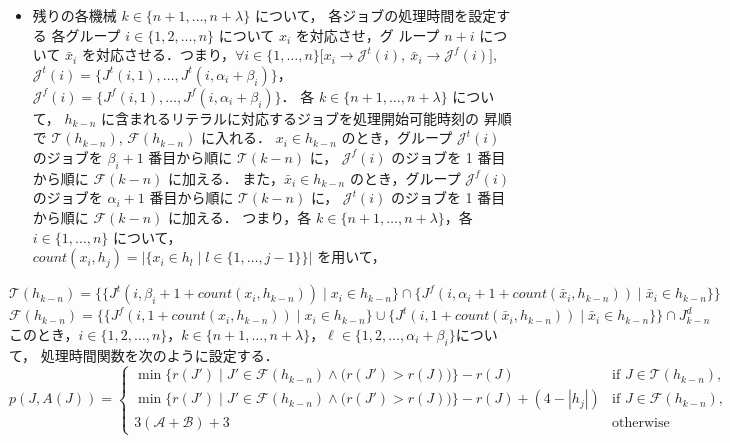 \documentclass[12pt]{optlab-bachelor}
\begin{document}
  \begin{itemize}
  \item 残りの各機械 $k \in \{n + 1, \ldots , n + \lambda\}$ について，
    各ジョブの処理時間を設定する
    各グループ $i \in \{1,2,\ldots,n\}$ について $x_i$ を対応させ，グ
    ループ $n + i$ について $\bar x_i$ を対応させる．つまり，$\forall
    i \in \{1,\ldots,n\}\big[x_i \to \mathcal{J}^t(i),\ \bar x_i \to
    \mathcal{J}^f(i) \big]$,
    $\mathcal{J}^t(i) = \big\{J^t(i,1),\ldots,J^t(i,\alpha_i +
    \beta_i)\big\}$，$\mathcal{J}^f(i) =
    \big\{J^f(i,1),\ldots,J^f(i,\alpha_i + \beta_i)\big\}$．
    各 $k \in \{n + 1, \ldots , n + \lambda\}$ について，
    $h_{k - n}$ に含まれるリテラルに対応するジョブを処理開始可能時刻の
    昇順で $\mathcal{T}(h_{k - n})$, $\mathcal{F}(h_{k - n})$ に入れる．
    $x_i \in h_{k - n}$ のとき，グループ $\mathcal{J}^t(i)$ のジョブを
    $\beta_i + 1$ 番目から順に $\mathcal{T}(k - n)$ に，
    $\mathcal{J}^f(i)$ のジョブを 1 番目から順に $\mathcal{F}(k - n)$ に加える．
    また，$\bar x_i \in h_{k - n}$ のとき，グループ $\mathcal{J}^f(i)$
    のジョブを $\alpha_i + 1$ 番目から順に $\mathcal{T}(k - n)$ に，
    $\mathcal{J}^t(i)$ のジョブを 1 番目から順に $\mathcal{F}(k - n)$ に加える．
    つまり，各 $k \in \{n + 1, \ldots,n + \lambda\}$，各 $i \in \{1,\ldots,n\}$ について，\\
    $count(x_i,h_j) = \big|\big\{x_i \in h_l \mid l \in \{1,\ldots,j -
    1\}\big\}\big|$ を用いて，
  \end{itemize}
    {\footnotesize
      $\mathcal{T}(h_{k - n}) = \bigg\{\big\{J^t(i,\beta_i + 1 +
      count(x_i,h_{k - n})) \mid x_i \in h_{k - n}\big\} \cap
      \big\{J^f(i,\alpha_i + 1 + count(\bar x_i, h_{k - n})) \mid \bar
      x_i \in h_{k - n}\big\}\bigg\}$\\
    }
    {\footnotesize
      $\mathcal{F}(h_{k - n}) = \bigg\{\big\{J^f(i,1 + count(
      x_i,h_{k - n})) \mid x_i \in h_{k - n} \big\} \cup \big\{J^t(i,1
      + count(\bar x_i,h_{k - n})) \mid \bar x_i \in h_{k - n}\big\} \bigg\}
      \cap J^d_{k - n}$\\
    }
    このとき，$i \in \{1,2,\ldots,n\}$，$k \in \{n + 1, \ldots , n +
    \lambda\}$，$\ell \in \{1,2,\ldots, \alpha_i + \beta_i\}$について，
    処理時間関数を次のように設定する．
  {\small
    $$p(J,A(J)) = \left\{ \begin{array}{lll} \min \big\{r(J') \mid J' \in \mathcal{F}(h_{k - n}) \wedge \big(r(J') > r(J) \big) \big\} - r(J) & \text{if } J \in \mathcal{T}(h_{k - n}), \\ \min \big\{r(J') \mid J' \in \mathcal{F}(h_{k - n}) \wedge \big(r(J') > r(J) \big) \big\} - r(J) + (4 - |h_j|) & \text{if } J \in \mathcal{F}(h_{k - n}), \\ 3(\mathcal{A} + \mathcal{B}) + 3 & \text{otherwise}\end{array} \right.$$
  }
  
\end{document}
